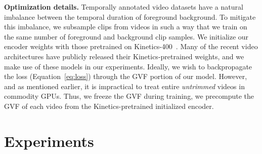 \documentclass[10pt,twocolumn,letterpaper]{article}
\begin{document}
\vspace{3pt}\noindent\textbf{Optimization details.}  
Temporally annotated video datasets have a natural imbalance between the temporal duration of foreground \vs background. To mitigate this imbalance, we subsample clips from videos in such a way that we train on the same number of foreground and background clip samples. 
We initialize our encoder weights with those pretrained on Kinetics-400~\cite{dataset_kinetics}. Many of the recent video architectures have publicly released their Kinetics-pretrained weights, and we make use of these models in our experiments. Ideally, we wish to backpropagate the loss (Equation~\ref{eq:loss}) through the GVF portion of our model. However, and as mentioned earlier, it is impractical to treat entire \emph{untrimmed} videos in commodity GPUs. Thus, we freeze the GVF during training, \ie we precompute the GVF of each video from the Kinetics-pretrained initialized encoder. 

 \section{Experiments}\label{sec:experiments}
\end{document}

